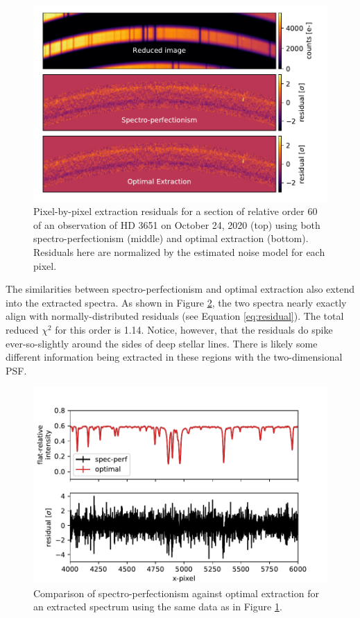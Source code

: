 \begin{figure}
    \centering
    \includegraphics[width=\textwidth]{figures-5/extraction-residuals.pdf}
    \caption[Spectro-perfectionism pixel-wise extraction residuals]{Pixel-by-pixel extraction residuals for a section of relative order 60 of an observation of HD 3651 on October 24, 2020 (top) using both spectro-perfectionism (middle) and optimal extraction (bottom). Residuals here are normalized by the estimated noise model for each pixel.}
    \label{fig:extraction-residuals}
\end{figure}

The similarities between spectro-perfectionism and optimal extraction also extend into the extracted spectra. As shown in Figure \ref{fig:spec-perf-vs-optimal}, the two spectra nearly exactly align with normally-distributed residuals (see Equation \ref{eq:residual}). The total reduced $\chi^2$ for this order is 1.14. Notice, however, that the residuals do spike ever-so-slightly around the sides of deep stellar lines. There is likely some different information being extracted in these regions with the two-dimensional PSF.

\begin{figure}
    \centering
    \includegraphics{figures-5/spec-perf-vs-optimal.pdf}
    \caption[Spectro-perfectionism vs. optimal extraction -- Stellar spectrum]{Comparison of spectro-perfectionism against optimal extraction for an extracted spectrum using the same data as in Figure \ref{fig:extraction-residuals}.}
    \label{fig:spec-perf-vs-optimal}
\end{figure}

